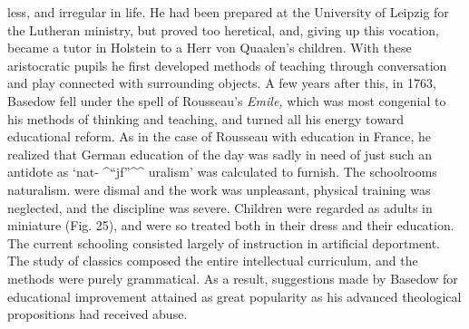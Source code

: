 \documentclass[
]{book}
\begin{document}
less, and irregular in life. He had been prepared at the University of Leipzig for the Lutheran ministry, but proved too heretical, and, giving up this vocation, became a tutor in Holstein to a Herr von Quaalen's children. With these aristocratic pupils he first developed methods of teaching through conversation and play connected with surrounding objects. A few years after this, in 1763, Basedow fell under the spell of Rousseau's \emph{Emile,} which was most congenial to his methods of thinking and teaching, and turned all his energy toward educational reform. As in the case of Rousseau with education in France, he realized that German education of the day was sadly in need of just such an antidote as `nat- \^{}``jf''\^{}\^{} uralism' was calculated to furnish. The schoolrooms naturalism. were dismal and the work was unpleasant, physical training was neglected, and the discipline was severe. Children were regarded as adults in miniature (Fig. 25), and were so treated both in their dress and their education. The current schooling consisted largely of instruction in artificial deportment. The study of classics composed the entire intellectual curriculum, and the methods were purely grammatical. As a result, suggestions made by Basedow for educational improvement attained as great popularity as his advanced theological propositions had received abuse.
\end{document}
